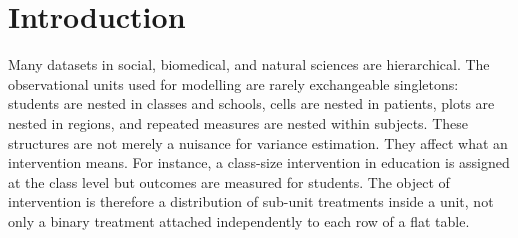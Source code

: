 \documentclass[unnumsec,webpdf,contemporary,large]{oup-authoring-template}%
\theoremstyle{thmstyleone}%
\theoremstyle{thmstyletwo}%
\theoremstyle{thmstylethree}%
\begin{document}
\maketitle
\makeatletter
\def\@evenhead{\hbox to \textwidth{\sffamily\fontsize{8bp}{10bp}\selectfont
{{\fontseries{m}\fontsize{9bp}{10bp}\selectfont\thepage}}\hspace*{4pt}\raisebox{-1.5pt}{\rule{.3pt}{8pt}}\hspace*{4pt}{\strut\@journaltitle, \@pubyear}\hfill}}
\def\@oddhead{\hbox to \textwidth{\hfill\sffamily\fontsize{8bp}{10bp}\selectfont
{{\strut\@journaltitle, \@pubyear}}\hspace*{4pt}\raisebox{-1.5pt}{\rule{.3pt}{8pt}}\hspace*{4pt}{{\fontseries{m}\fontsize{9bp}{10bp}\selectfont\thepage}}}}
\makeatother

\section{Introduction}
\label{sec:intro}

Many datasets in social, biomedical, and natural sciences are hierarchical.
The observational units used for modelling are rarely exchangeable singletons: students are nested in classes and schools, cells are nested in patients, plots are nested in regions, and repeated measures are nested within subjects.
These structures are not merely a nuisance for variance estimation.
They affect what an intervention means.
For instance, a class-size intervention in education is assigned at the class level but outcomes are measured for students.
The object of intervention is therefore a distribution of sub-unit treatments inside a unit, not only a binary treatment attached independently to each row of a flat table.
\end{document}
